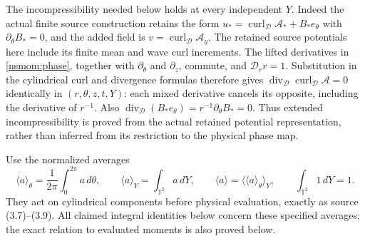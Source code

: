 The incompressibility needed below holds at every independent $Y$.
Indeed the actual finite source construction retains the form
$u_* =\operatorname{curl}_{\mathscr D}\mathcal A_*+
B_*e_\theta$ with $\partial_\theta B_*=0$, and the added field is
$v=\operatorname{curl}_{\mathscr D}\mathcal A_y$. The retained source
potentials here include its finite mean and wave curl increments.
The lifted derivatives in \eqref{nsmom:phase}, together with
$\partial_\theta$ and $\partial_z$, commute, and
$\mathscr D_r r=1$. Substitution in the cylindrical curl and
divergence formulas therefore gives
$\operatorname{div}_{\mathscr D}\operatorname{curl}_{\mathscr D}
\mathcal A=0$ identically in $(r,\theta,z,t,Y)$: each mixed derivative
cancels its opposite, including the derivative of $r^{-1}$.
Also $\operatorname{div}_{\mathscr D}(B_*e_\theta)
=r^{-1}\partial_\theta B_*=0$.
Thus extended incompressibility is proved from the actual retained
potential representation, rather than inferred from its restriction to
the physical phase map.

Use the normalized averages
\[
 \langle a\rangle_\theta=\frac1{2\pi}\int_0^{2\pi}a\,d\theta,
 \qquad \langle a\rangle_Y=\int_{\mathbb T^2}a\,dY,
 \qquad\langle a\rangle=\langle\langle a\rangle_\theta\rangle_Y,
 \qquad\int_{\mathbb T^2}1\,dY=1.
\]
They act on cylindrical components before physical evaluation, exactly
as source (3.7)--(3.9). All claimed integral identities below concern
these specified averages; the exact relation to evaluated moments is
also proved below.

